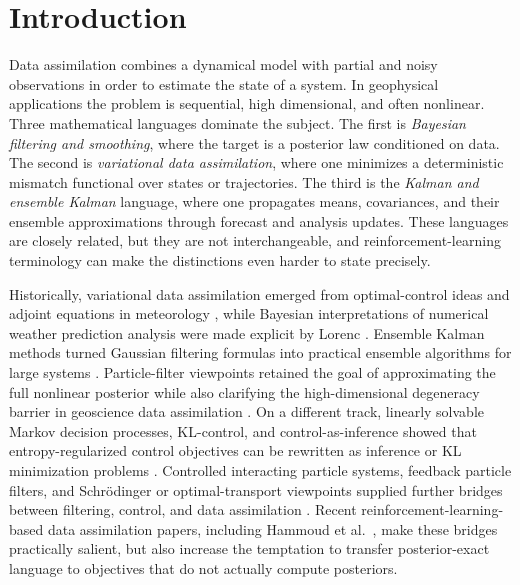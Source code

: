 \documentclass[11pt]{article}
\numberwithin{equation}{section}
\theoremstyle{plain}
\theoremstyle{definition}
\theoremstyle{remark}
\begin{document}
\section{Introduction}
\label{sec:introduction}

Data assimilation combines a dynamical model with partial and noisy observations in order to estimate the state of a system. In geophysical applications the problem is sequential, high dimensional, and often nonlinear. Three mathematical languages dominate the subject. The first is \emph{Bayesian filtering and smoothing}, where the target is a posterior law conditioned on data. The second is \emph{variational data assimilation}, where one minimizes a deterministic mismatch functional over states or trajectories. The third is the \emph{Kalman and ensemble Kalman} language, where one propagates means, covariances, and their ensemble approximations through forecast and analysis updates. These languages are closely related, but they are not interchangeable, and reinforcement-learning terminology can make the distinctions even harder to state precisely.

Historically, variational data assimilation emerged from optimal-control ideas and adjoint equations in meteorology \citep{ledimet1986,talagrandcourtier1987}, while Bayesian interpretations of numerical weather prediction analysis were made explicit by Lorenc \cite{lorenc1986}. Ensemble Kalman methods turned Gaussian filtering formulas into practical ensemble algorithms for large systems \citep{burgers1998,whitakerhamill2002,tippett2003,evensen2003}. Particle-filter viewpoints retained the goal of approximating the full nonlinear posterior while also clarifying the high-dimensional degeneracy barrier in geoscience data assimilation \citep{fearnheadkuensch2018,vanleeuwen2019}. On a different track, linearly solvable Markov decision processes, KL-control, and control-as-inference showed that entropy-regularized control objectives can be rewritten as inference or KL minimization problems \citep{toussaintstorkey2006,todorov2006,todorov2008,todorov2009,kappen2012,rawlik2012,levine2018}. Controlled interacting particle systems, feedback particle filters, and Schr\"odinger or optimal-transport viewpoints supplied further bridges between filtering, control, and data assimilation \citep{yang2013,taghvaeimehta2023,reich2019}. Recent reinforcement-learning-based data assimilation papers, including Hammoud et al.\ \cite{hammoud2024}, make these bridges practically salient, but also increase the temptation to transfer posterior-exact language to objectives that do not actually compute posteriors.
\end{document}
